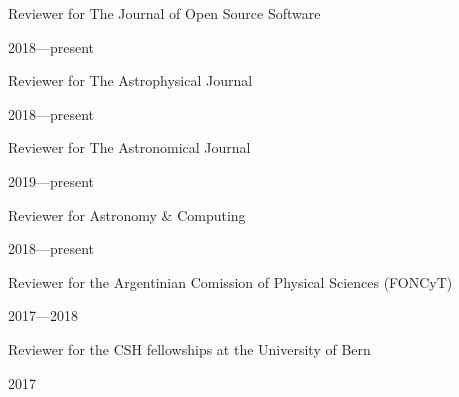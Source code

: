\documentclass[12pt, a4paper]{article} %
\begin{document}
\begin{minipage}[t]{0.7\textwidth}
\begin{flushleft}%
  \setlength{\leftskip}{0.2cm}%
Reviewer for The Journal of Open Source Software
\end{flushleft}
\end{minipage}
\begin{minipage}[t]{0.3\textwidth}
\hfill 2018---present
\end{minipage}

\begin{minipage}[t]{0.7\textwidth}
\begin{flushleft}%
  \setlength{\leftskip}{0.2cm}%
Reviewer for The Astrophysical Journal
\end{flushleft}
\end{minipage}
\begin{minipage}[t]{0.3\textwidth}
\hfill 2018---present
\end{minipage}

\begin{minipage}[t]{0.7\textwidth}
\begin{flushleft}%
  \setlength{\leftskip}{0.2cm}%
Reviewer for The Astronomical Journal
\end{flushleft}
\end{minipage}
\begin{minipage}[t]{0.3\textwidth}
\hfill 2019---present
\end{minipage}

\begin{minipage}[t]{0.7\textwidth}
\begin{flushleft}%
  \setlength{\leftskip}{0.2cm}%
Reviewer for Astronomy \& Computing
\end{flushleft}
\end{minipage}
\begin{minipage}[t]{0.3\textwidth}
\hfill 2018---present
\end{minipage}

\begin{minipage}[t]{0.7\textwidth}
\begin{flushleft}%
  \setlength{\leftskip}{0.2cm}%
Reviewer for the Argentinian Comission of Physical Sciences (FONCyT)
\end{flushleft}
\end{minipage}
\begin{minipage}[t]{0.3\textwidth}
\hfill 2017---2018
\end{minipage}

\begin{minipage}[t]{0.7\textwidth}
\begin{flushleft}%
  \setlength{\leftskip}{0.2cm}%
Reviewer for the CSH fellowships at the University of Bern 
\end{flushleft}
\end{minipage}
\begin{minipage}[t]{0.3\textwidth}
\hfill 2017
\end{minipage}
\end{document}
